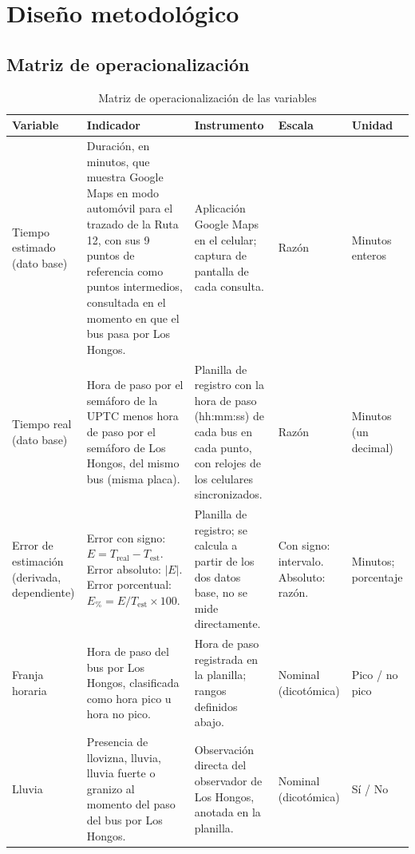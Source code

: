 \section{Diseño metodológico}
\subsection{Matriz de operacionalización}

\begin{table}[htbp]
\centering
\small
\renewcommand{\arraystretch}{1.3}
\setlength{\emergencystretch}{3em}
\caption{Matriz de operacionalización de las variables}
\label{tab:operacionalizacion}
\begin{tabular}{p{2.3cm} p{4.5cm} p{3.4cm} p{2.2cm} p{1.8cm}}
\toprule
\textbf{Variable} & \textbf{Indicador} & \textbf{Instrumento} & \textbf{Escala} & \textbf{Unidad} \\
\midrule
Tiempo estimado (dato base) &
Duración, en minutos, que muestra Google Maps en modo automóvil para el trazado de la Ruta 12, con sus 9 puntos de referencia como puntos intermedios, consultada en el momento en que el bus pasa por Los Hongos. &
Aplicación Google Maps en el celular; captura de pantalla de cada consulta. &
Razón & Minutos enteros \\
\addlinespace
Tiempo real (dato base) &
Hora de paso por el semáforo de la UPTC menos hora de paso por el semáforo de Los Hongos, del mismo bus (misma placa). &
Planilla de registro con la hora de paso (hh:mm:ss) de cada bus en cada punto, con relojes de los celulares sincronizados.&
Razón & Minutos (un decimal) \\
\addlinespace
Error de estimación (derivada, dependiente) &
Error con signo: $E = T_{\mathrm{real}} - T_{\mathrm{est}}$. Error absoluto: $\lvert E \rvert$. Error porcentual: $E_{\%} = E / T_{\mathrm{est}} \times 100$. &
Planilla de registro; se calcula a partir de los dos datos base, no se mide directamente. &
Con signo: intervalo. Absoluto: razón. &
Minutos; porcentaje \\
\addlinespace
Franja horaria &
Hora de paso del bus por Los Hongos, clasificada como hora pico u hora no pico. &
Hora de paso registrada en la planilla; rangos definidos abajo. &
Nominal (dicotómica) & Pico / no pico \\
\addlinespace
Lluvia &
Presencia de llovizna, lluvia, lluvia fuerte o granizo al momento del paso del bus por Los Hongos. &
Observación directa del observador de Los Hongos, anotada en la planilla. &
Nominal (dicotómica) & Sí / No \\

\end{tabular}
\end{table}
